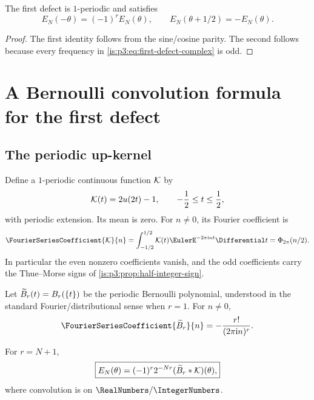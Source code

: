 \begin{corollary}
\label{is:p3:cor:defect-symmetries}
The first defect is $1$-periodic and satisfies
\begin{equation}
 E_N(-\theta)=(-1)^rE_N(\theta),
 \qquad
 E_N(\theta+1/2)=-E_N(\theta).
 \label{is:p3:eq:defect-symmetries}
\end{equation}
\end{corollary}

\begin{proof}
The first identity follows from the sine/cosine parity.  The second follows because every frequency in \eqref{is:p3:eq:first-defect-complex} is odd.
\end{proof}

\section{A Bernoulli convolution formula for the first defect}
\label{is:p3:sec:bernoulli-kernel}

\subsection{The periodic up-kernel}

Define a $1$-periodic continuous function $\mathcal K$ by
\begin{equation}
 \mathcal K(t)=2u(2t)-1,
 \qquad -\frac12\le t\le\frac12,
 \label{is:p3:eq:K-kernel}
\end{equation}
with periodic extension.  Its mean is zero.  For $n\ne0$, its Fourier coefficient is
\begin{equation}
 \FourierSeriesCoefficient{\Kcal}{n}
 =\int_{-1/2}^{1/2}\Kcal(t)\EulerE^{-2\pi\iu nt}\Differential t
 =\PhiCyc(n/2).
 \label{is:p3:eq:K-Fourier}
\end{equation}
In particular the even nonzero coefficients vanish, and the odd coefficients carry the Thue--Morse signs of \cref{is:p3:prop:half-integer-sign}.

Let $\widetilde B_r(t)=B_r(\{t\})$ be the periodic Bernoulli polynomial, understood in the standard Fourier/distributional sense when $r=1$.  For $n\ne0$,
\begin{equation}
 \FourierSeriesCoefficient{\Bper_r}{n}=-\frac{r!}{(2\pi\iu n)^r}.
 \label{is:p3:eq:periodic-Bernoulli-Fourier}
\end{equation}

\begin{theorem}
\label{is:p3:thm:Bernoulli-convolution}
For $r=N+1$,
\begin{equation}
 \boxed{\displaystyle
 E_N(\theta)=(-1)^r2^{-Nr}
 (\widetilde B_r*\mathcal K)(\theta),}
 \label{is:p3:eq:Bernoulli-convolution}
\end{equation}
where convolution is on $\RealNumbers/\IntegerNumbers$.
\end{theorem}

